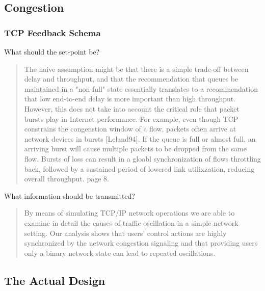 \subsection{Congestion}

\subsubsection{TCP Feedback Schema} 

What should the set-point be?

\begin{quote}
The naive assumption might be that there is a simple trade-off between delay and throughput, and
that the recommendation that queues be maintained in a "non-full" state essentially translates
to a recommendation that low end-to-end delay is more important than high throughput. However,
this does not take into account the critical role that packet bursts play in Internet
performance. For example, even though TCP constrains the congenstion window of a flow, packets
often arrive at network devices in bursts [Leland94]. If the queue is full or almost full, an
arriving burst will cause multiple packets to be dropped from the same flow. Bursts of loss can
result in a gloabl synchronization of flows throttling back, followed by a sustained period of
lowered link utilixzation, reducing overall throughput. \cite{rfc7567} page 8.
\end{quote}

What information should be transmitted?

\begin{quote}
By means of simulating TCP/IP network operations we are able to examine in detail the causes of
traffic oscillation in a simple network setting. Our analysis shows that users' control actions
are highly synchronized by the network congestion signaling and that providing users only a
    binary network state can lead to repeated oscillations\cite{zhang1990}.
\end{quote}



\subsection{The Actual Design}


